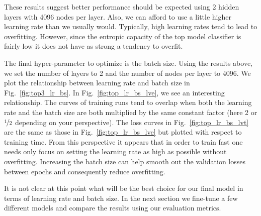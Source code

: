 \documentclass[12pt,journal,compsoc]{IEEEtran}
\begin{document}
These results suggest better performance should be expected using 2 hidden layers with 4096 nodes per layer. Also, we can afford to use a little higher learning rate than we usually would. Typically, high learning rates tend to lead to overfitting. However, since the entropic capacity of the top model classifier is fairly low it does not have as strong a tendency to overfit.

The final hyper-parameter to optimize is the batch size. Using the results above, we set the number of layers to 2 and the number of nodes per layer to 4096. We plot the relationship between learning rate and batch size in Fig.~\ref{fig:top3_lr_bs}. In Fig.~\ref{fig:top_lr_bs_lve}, we see an interesting relationship.  The curves of training runs tend to overlap when both the learning rate and the batch size are both multiplied by the same constant factor (here 2 or $\nicefrac{1}{2}$ depending on your perspective). The loss curves in Fig.~\ref{fig:top_lr_bs_lvt} are the same as those in Fig.~\ref{fig:top_lr_bs_lve} but plotted with respect to training time. From this perspective it appears that in order to train fast one needs only focus on setting the learning rate as high as possible without overfitting. Increasing the batch size can help smooth out the validation losses between epochs and consequently reduce overfitting.


It is not clear at this point what will be the best choice for our final model in terms of learning rate and batch size. In the next section we fine-tune a few different models and compare the results using our evaluation metrics. 



\end{document}
